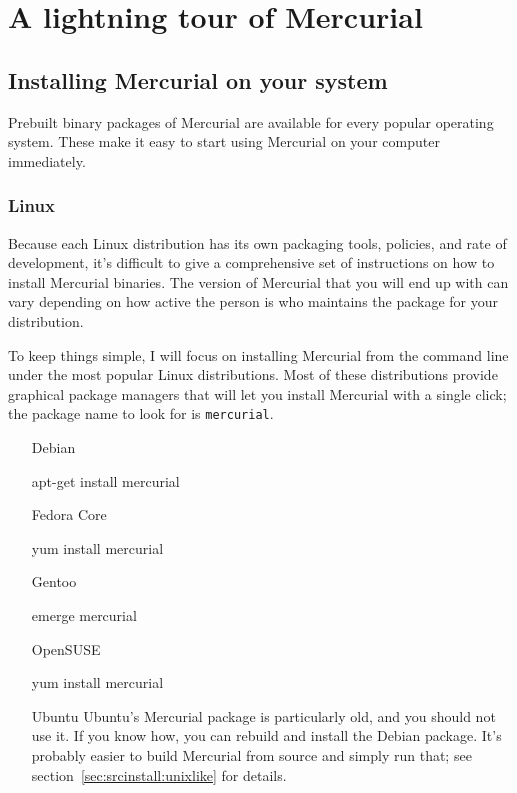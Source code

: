 \chapter{A lightning tour of Mercurial}
\label{chap:tour}

\section{Installing Mercurial on your system}
\label{sec:tour:install}

Prebuilt binary packages of Mercurial are available for every popular
operating system.  These make it easy to start using Mercurial on your
computer immediately.

\subsection{Linux}

Because each Linux distribution has its own packaging tools, policies,
and rate of development, it's difficult to give a comprehensive set of
instructions on how to install Mercurial binaries.  The version of
Mercurial that you will end up with can vary depending on how active
the person is who maintains the package for your distribution.

To keep things simple, I will focus on installing Mercurial from the
command line under the most popular Linux distributions.  Most of
these distributions provide graphical package managers that will let
you install Mercurial with a single click; the package name to look
for is \texttt{mercurial}.

\begin{itemize}
\item[Debian]
  \begin{codesample4}
    apt-get install mercurial
  \end{codesample4}

\item[Fedora Core]
  \begin{codesample4}
    yum install mercurial
  \end{codesample4}

\item[Gentoo]
  \begin{codesample4}
    emerge mercurial
  \end{codesample4}

\item[OpenSUSE]
  \begin{codesample4}
    yum install mercurial
  \end{codesample4}

\item[Ubuntu] Ubuntu's Mercurial package is particularly old, and you
  should not use it.  If you know how, you can rebuild and install the
  Debian package.  It's probably easier to build Mercurial from source
  and simply run that; see section~\ref{sec:srcinstall:unixlike} for
  details.
\end{itemize}

